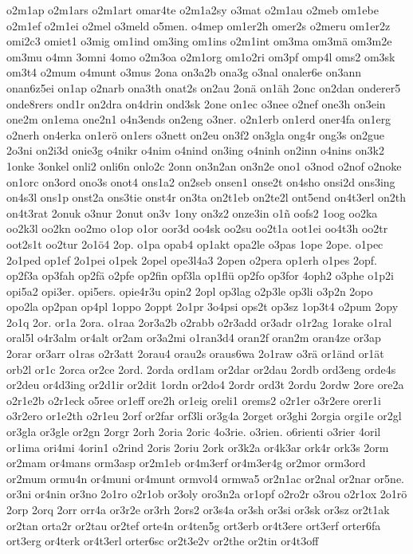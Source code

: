 {o2m1ap
o2m1ars
o2m1art
omar4te
o2m1a2sy
o3mat
o2m1au
o2meb
om1ebe
o2m1ef
o2m1ei
o2mel
o3meld
o5men.
o4mep
om1er2h
omer2s
o2meru
om1er2z
omi2c3
omiet1
o3mig
om1ind
om3ing
om1ins
o2m1int
om3ma
om3mä
om3m2e
om3mu
o4mn
3omni
4omo
o2m3oa
o2m1org
om1o2ri
om3pf
omp4l
oms2
om3sk
om3t4
o2mum
o4munt
o3mus
2ona
on3a2b
ona3g
o3nal
onaler6e
on3ann
onan6z5ei
on1ap
o2narb
ona3th
onat2s
on2au
2onä
on1äh
2onc
on2dan
onderer5
onde8rers
ond1r
on2dra
on4drin
ond3sk
2one
on1ec
o3nee
o2nef
one3h
on3ein
one2m
on1ema
one2n1
o4n3ends
on2eng
o3ner.
o2n1erb
on1erd
oner4fa
on1erg
o2nerh
on4erka
on1erö
on1ers
o3nett
on2eu
on3f2
on3gla
ong4r
ong3s
on2gue
2o3ni
on2i3d
onie3g
o4nikr
o4nim
o4nind
on3ing
o4ninh
on2inn
o4nins
on3k2
1onke
3onkel
onli2
onli6n
onlo2c
2onn
on3n2an
on3n2e
ono1
o3nod
o2nof
o2noke
on1orc
on3ord
ono3s
onot4
ons1a2
on2seb
onsen1
onse2t
on4sho
onsi2d
ons3ing
on4s3l
ons1p
onst2a
ons3tie
onst4r
on3ta
on2t1eb
on2te2l
ont5end
on4t3erl
on2th
on4t3rat
2onuk
o3nur
2onut
on3v
1ony
on3z2
onze3in
o1ñ
oofs2
1oog
oo2ka
oo2k3l
oo2kn
oo2mo
o1op
o1or
oor3d
oo4sk
oo2su
oo2t1a
oot1ei
oo4t3h
oo2tr
oot2s1t
oo2tur
2o1ö4
2op.
o1pa
opab4
op1akt
opa2le
o3pas
1ope
2ope.
o1pec
2o1ped
op1ef
2o1pei
o1pek
2opel
ope3l4a3
2open
o2pera
op1erh
o1pes
2opf.
op2f3a
op3fah
op2fä
o2pfe
op2fin
opf3la
op1flü
op2fo
op3for
4oph2
o3phe
o1p2i
opi5a2
opi3er.
opi5ers.
opie4r3u
opin2
2opl
op3lag
o2p3le
op3li
o3p2n
2opo
opo2la
op2pan
op4pl
1oppo
2oppt
2o1pr
3o4psi
ops2t
op3sz
1op3t4
o2pum
2opy
2o1q
2or.
or1a
2ora.
o1raa
2or3a2b
o2rabb
o2r3add
or3adr
o1r2ag
1orake
o1ral
oral5l
o4r3alm
or4alt
or2am
or3a2mi
o1ran3d4
oran2f
oran2m
oran4ze
or3ap
2orar
or3arr
o1ras
o2r3att
2orau4
orau2s
oraus6wa
2o1raw
o3rä
or1änd
or1ät
orb2l
or1c
2orca
or2ce
2ord.
2orda
ord1am
or2dar
or2dau
2ordb
ord3eng
orde4s
or2deu
or4d3ing
or2d1ir
or2dit
1ordn
or2do4
2ordr
ord3t
2ordu
2ordw
2ore
ore2a
o2r1e2b
o2r1eck
o5ree
or1eff
ore2h
or1eig
oreli1
orems2
o2r1er
o3r2ere
orer1i
o3r2ero
or1e2th
o2r1eu
2orf
or2far
orf3li
or3g4a
2orget
or3ghi
2orgia
orgi1e
or2gl
or3gla
or3gle
or2gn
2orgr
2orh
2oria
2oric
4o3rie.
o3rien.
o6rienti
o3rier
4oril
or1ima
ori4mi
4orin1
o2rind
2oris
2oriu
2ork
or3k2a
or4k3ar
ork4r
ork3s
2orm
or2mam
or4mans
orm3asp
or2m1eb
or4m3erf
or4m3er4g
or2mor
orm3ord
or2mum
ormu4n
or4muni
or4munt
ormvol4
ormwa5
or2n1ac
or2nal
or2nar
or5ne.
or3ni
or4nin
or3no
2o1ro
o2r1ob
or3oly
oro3n2a
or1opf
o2ro2r
o3rou
o2r1ox
2o1rö
2orp
2orq
2orr
orr4a
or3r2e
or3rh
2ors2
or3s4a
or3sh
or3si
or3sk
or3sz
or2t1ak
or2tan
orta2r
or2tau
or2tef
orte4n
or4ten5g
ort3erb
or4t3ere
ort3erf
orter6fa
ort3erg
or4terk
or4t3erl
orter6sc
or2t3e2v
or2the
or2tin
or4t3off
}
